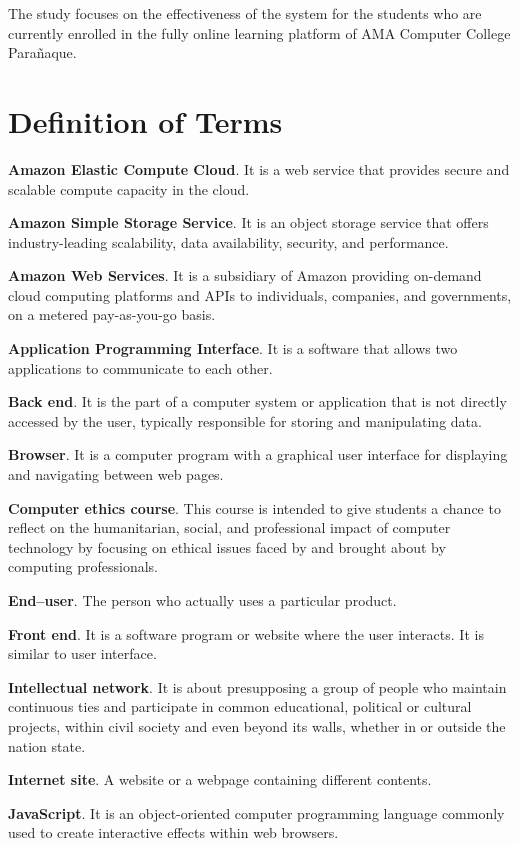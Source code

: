 The study focuses on the effectiveness of the system for the students who are currently enrolled in the fully online learning platform of AMA Computer College Parañaque.

\section{Definition of Terms}

\textbf{Amazon Elastic Compute Cloud}.
It is a web service that provides secure and scalable compute capacity in the cloud.

\textbf{Amazon Simple Storage Service}.
It is an object storage service that offers industry-leading scalability, data availability, security, and performance.

\textbf{Amazon Web Services}.
It is a subsidiary of Amazon providing on-demand cloud computing platforms and APIs to individuals, companies, and governments, on a metered pay-as-you-go basis.

\textbf{Application Programming Interface}.
It is a software that allows two applications to communicate to each other.

\textbf{Back end}.
It is the part of a computer system or application that is not directly accessed by the user, typically responsible for storing and manipulating data.

\textbf{Browser}.
It is a computer program with a graphical user interface for displaying and navigating between web pages.

\textbf{Computer ethics course}.
This course is intended to give students a chance to reflect on the humanitarian, social, and professional impact of computer technology by focusing on ethical issues faced by and brought about by computing professionals.

\textbf{End–user}.
The person who actually uses a particular product.

\textbf{Front end}.
It is a software program or website where the user interacts. It is similar to user interface.

\textbf{Intellectual network}.
It is about presupposing a group of people who maintain continuous ties and participate in common educational, political or cultural projects, within civil society and even beyond its walls, whether in or outside the nation state.

\textbf{Internet site}.
A website or a webpage containing different contents.

\textbf{JavaScript}.
It is an object-oriented computer programming language commonly used to create interactive effects within web browsers.

